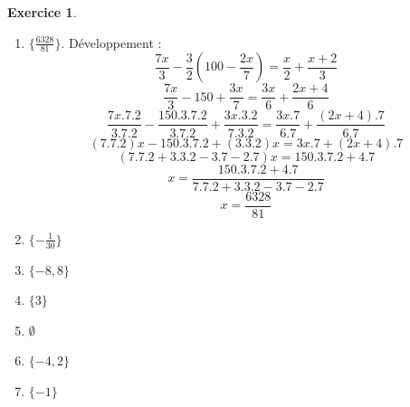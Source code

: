 \documentclass[a4paper,13pt]{scrreprt}
\theoremstyle{plain}
\theoremstyle{definition}
\newtheorem{exo}[subsection]{Exercice}
\begin{document}
\begin{exo}
	\begin{enumerate} \item $\{ \frac{6328}{81} \}$. Développement : \\$$\frac{7x}{3}-\frac{3}{2}(100-\frac{2x}{7}) = \frac{x}{2} + \frac{x+2}{3}$$
		$$\frac{7x}{3}-150 + \frac{3x}{7} = \frac{3x}{6} + \frac{2x+4}{6}$$
		$$\frac{7x.7.2}{3.7.2}-\frac{150.3.7.2}{3.7.2} + \frac{3x.3.2}{7.3.2} = \frac{3x.7}{6.7} + \frac{(2x+4).7}{6.7}$$
		$$(7.7.2)x-150.3.7.2 + (3.3.2)x = 3x.7 + (2x+4).7$$
		$$(7.7.2 + 3.3.2 - 3.7 - 2.7)x=150.3.7.2+4.7$$
		$$x=\frac{150.3.7.2+4.7}{7.7.2 + 3.3.2 - 3.7 - 2.7}$$
		$$x=\frac{6328}{81}$$
		\item $\{ -\frac{1}{30} \}$
		\item $\{ -8,8 \}$
		\item $\{ 3 \}$
		\item $\emptyset$
		\item $\{ -4,2 \}$
		\item $\{ -1 \}$
	\end{enumerate}
\end{exo}
\end{document}
